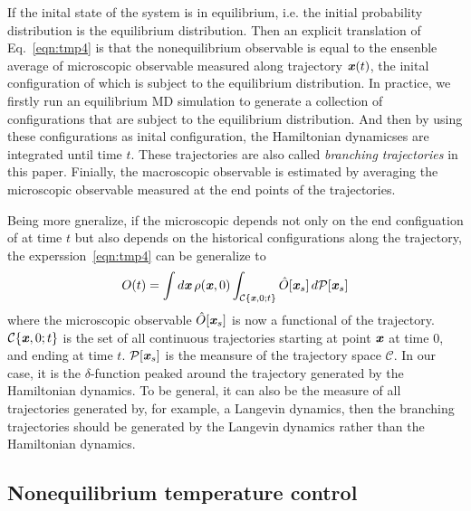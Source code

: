\documentclass[aip,jcp,a4paper,preprint,onecolumn]{revtex4-1}
\newcommand{\vect}[1]{\textbf{\textit{#1}}}
\begin{document}
If the inital state of the system is in equilibrium, i.e. the initial
probability distribution is the equilibrium distribution. Then an
explicit translation of Eq.~\eqref{eqn:tmp4} is that the
nonequilibrium observable is equal to the ensenble average of
microscopic observable measured along trajectory $\vect x(t)$, the
inital configuration of which is subject to the equilibrium
distribution. In practice, we firstly run an equilibrium MD simulation
to generate a collection of configurations that are subject to the
equilibrium distribution. And then by using these configurations as
inital configuration, the Hamiltonian dynamicses are integrated until
time $t$. These trajectories are also called \emph{branching
  trajectories} in this paper. Finially, the macroscopic observable is
estimated by averaging the microscopic observable measured at the end
points of the trajectories.

Being more gneralize, if the microscopic depends not only on the end
configuation of at time $t$ but also depends on the historical
configurations along the trajectory, the experssion~\eqref{eqn:tmp4} can be generalize to
\begin{align}
  O(t) = \int d\vect x\,\rho(\vect x, 0) \int_{\mathcal C\{\vect x, 0; t\}} \hat O[\vect x_s] \,d\mathcal P[\vect x_s] 
\end{align}
where the microscopic observable $ \hat O[\vect x_s] $ is now a
functional of the trajectory.  $\mathcal C\{\vect x, 0; t\}$ is the
set of all continuous trajectories starting at point $\vect x$ at time
0, and ending at time $t$. $\mathcal P[\vect x_s] $ is the meansure of
the trajectory space $\mathcal C$.  In our case, it is the
$\delta$-function peaked around the trajectory generated by the
Hamiltonian dynamics. To be general, it can also be the measure of all
trajectories generated by, for example, a Langevin dynamics, then the
branching trajectories should be generated by the Langevin
dynamics rather than the Hamiltonian dynamics.


\subsection{Nonequilibrium temperature control}\label{sec:tmp2b}
\end{document}
